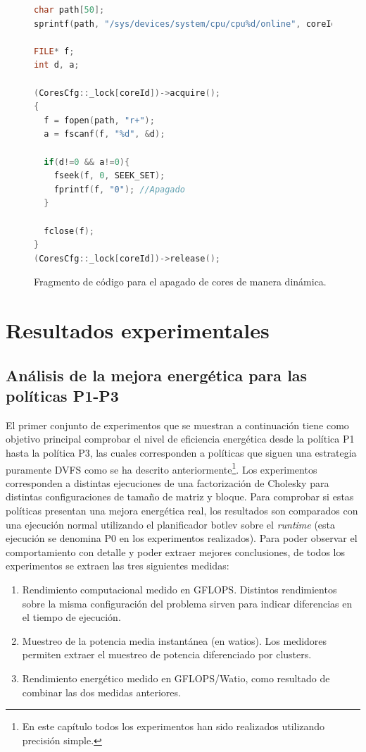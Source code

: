 \begin{figure}
  \centering
\begin{lstlisting}[language=C++]
char path[50];
sprintf(path, "/sys/devices/system/cpu/cpu%d/online", coreId);

FILE* f;
int d, a;

(CoresCfg::_lock[coreId])->acquire();
{
  f = fopen(path, "r+");
  a = fscanf(f, "%d", &d);
	
  if(d!=0 && a!=0){
    fseek(f, 0, SEEK_SET);
    fprintf(f, "0"); //Apagado
  }
	
  fclose(f);
}
(CoresCfg::_lock[coreId])->release();
\end{lstlisting}
  \caption{Fragmento de código para el apagado de cores de manera
    dinámica.}
  \label{fig:lst:apagado-cores}
\end{figure}





\section{Resultados experimentales}
\subsection{Análisis de la mejora energética para las políticas P1-P3}
El primer conjunto de experimentos que se muestran a continuación tiene
como objetivo principal comprobar el nivel de eficiencia energética desde
la política P1 hasta la política P3, las cuales corresponden a políticas
que siguen una estrategia puramente DVFS como se ha descrito
anteriormente\footnote{En este capítulo todos los experimentos han sido
  realizados utilizando precisión simple.}. Los experimentos corresponden a
distintas ejecuciones de una factorización de Cholesky para distintas
configuraciones de tamaño de matriz y bloque. Para comprobar si estas
políticas presentan una mejora energética real, los resultados son
comparados con una ejecución normal utilizando el planificador botlev sobre
el \emph{runtime} \ompss (esta ejecución se denomina P0 en los experimentos
realizados). Para poder observar el comportamiento con detalle y poder
extraer mejores conclusiones, de todos los experimentos se extraen las tres
siguientes medidas:
\begin{enumerate}
\item Rendimiento computacional medido en GFLOPS. Distintos rendimientos
  sobre la misma configuración del problema sirven para indicar
  diferencias en el tiempo de ejecución.
\item Muestreo de la potencia media instantánea (en watios). Los medidores
  permiten extraer el muestreo de potencia diferenciado por clusters.
\item Rendimiento energético medido en GFLOPS/Watio, como resultado de
  combinar las dos medidas anteriores.
\end{enumerate}

